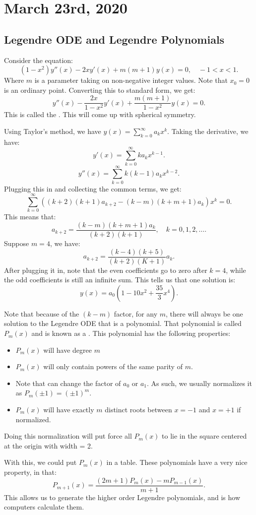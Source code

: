 \documentclass[../main/main.tex]{subfiles}
\begin{document}
\section{March  23rd, 2020}
\subsection{Legendre ODE and Legendre Polynomials}
Consider the equation: \[
	(1-x^2)y''(x)-2xy'(x)+m(m+1)y(x) = 0, \quad -1 < x < 1
.\] 
Where $m$ is a parameter taking on non-negative integer values. Note that $x_0=0$ is an ordinary point. Converting this to standard form, we get: \[
	y''(x) -\frac{2x}{1-x^2}y'(x) + \frac{m(m+1)}{1-x^2}y(x)=0
.\] This is called the . This will come up with spherical symmetry.

Using Taylor's method, we have $y(x) = \sum_{k=0}^{\infty} a_kx^{k}$. Taking the derivative, we have: \[
	y'(x) = \sum_{k=0}^{\infty}k a_k x^{k-1}
.\] \[ 
y''(x) = \sum_{k=0}^{\infty}k(k-1) a_k x^{k-2}
.\] Plugging this in and collecting the common terms, we get: \[
\sum_{k=0}^{\infty} \left( (k+2)(k+1)a_{k+2}-(k-m)(k+m+1)a_k \right) x^{k}=0
.\] This means that: \[
a_{k+2} = \frac{(k-m)(k+m+1)a_k}{(k+2)(k+1)}, \quad k=0,1,2,\ldots
.\] Suppose $m=4$, we have: \[
a_{k+2} = \frac{(k-4)(k+5)}{(k+2)(K+1)}a_k
.\] After plugging it in, note that the even coefficients go to zero after $k=4$, while the odd coefficients is still an infinite sum. This tells us that one solution is: \[
y(x) = a_0(1-10x^2+\frac{35}{3}x^{4})
.\] 

Note that because of the $(k-m)$ factor, for any  $m$, there will always be one solution to the Legendre ODE that is a polynomial. That polynomial is called  $P_m(x)$ and is known as a . This polynomial has the following properties: 
\begin{itemize}
	\item $P_m(x)$ will have degree $m$
	\item $P_m(x)$ will only contain powers of the same parity of $m$.
	\item Note that can change the factor of $a_0$ or $a_1$. As such, we usually normalizes it as $P_m(\pm 1) = (\pm 1)^{m}$. 
	\item $P_m(x)$ will have exactly $m$ distinct roots between $x=-1$ and $x=+1$ if normalized.
\end{itemize}
\begin{remark}
	Doing this normalization will put force all $P_m(x)$ to lie in the square centered at the origin with width = 2.
\end{remark}
With this, we could put $P_m(x)$ in a table. These polynomials have a very nice property, in that: \[
	P_{m+1}(x) = \frac{(2m+1) P_m(x) -mP_{m-1}(x)}{m+1}
.\] 
This allows us to generate the higher order Legendre polynomials, and is how computers calculate them.
\end{document}
